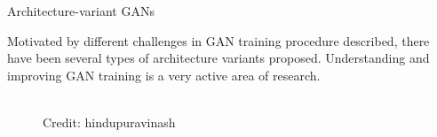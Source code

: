 
\begin{frame} {Architecture-variant GANs}

Motivated by different challenges in GAN training procedure described, there have been several types of architecture variants proposed.
Understanding and improving GAN training is a very active area of research.

  \begin{figure}
    \centering
      \tiny{\\Credit: hindupuravinash}
  \end{figure}
  \end{frame}
 
% 
%



